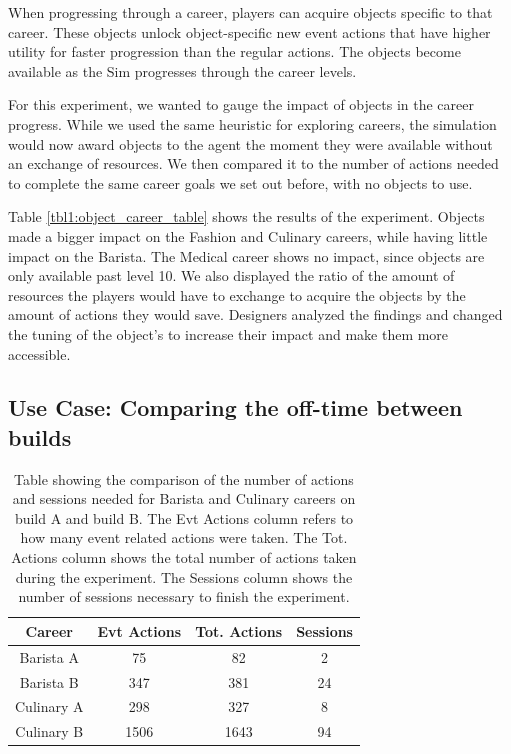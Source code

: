 \documentclass[letterpaper]{article} %
\begin{document}
When progressing through a career, players can acquire objects specific to that career. These objects unlock object-specific new event actions that have higher utility for faster progression than the regular actions. The objects become available as the Sim progresses through the career levels.

For this experiment, we wanted to gauge the impact of objects in the career progress. While we used the same heuristic for exploring careers, the simulation would now award objects to the agent the moment they were available without an exchange of resources. We then compared it to the number of actions needed to complete the same career goals we set out before, with no objects to use.

Table \ref{tbl1:object_career_table} shows the results of the experiment. Objects made a bigger impact on the Fashion and Culinary careers, while having little impact on the Barista. The Medical career shows no impact, since objects are only available past level 10. We also displayed the ratio of the amount of resources the players would have to exchange to acquire the objects by the amount of actions they would save. Designers analyzed the findings and  changed the tuning of the object's to increase their impact and make them more accessible.

\subsection{Use Case: Comparing the off-time between builds}

\begin{table}
\begin{center}
\begin{tabular}{ |c|c|c|c| }
\hline
\textbf{Career} & \textbf{Evt Actions} & \textbf{Tot. Actions} & \textbf{Sessions} \\
\hline
Barista A & 75 & 82 & 2 \\
\hline
Barista B & 347 & 381 & 24 \\
\hline
Culinary A & 298 & 327 & 8 \\
\hline
Culinary B & 1506 & 1643 & 94 \\
\hline
\end{tabular}
\end{center}
\caption{Table showing the comparison of the number of actions and sessions needed for Barista and Culinary careers on build A and build B. The Evt Actions column refers to how many event related actions were taken. The Tot. Actions column shows the total number of actions taken during the experiment. The Sessions column shows the number of sessions necessary to finish the experiment.}
\label{tbl2:career_by_build_table}
\end{table}
\end{document}

